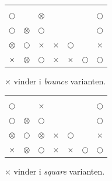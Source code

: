 \begin{minipage}{0.45\textwidth}
\centering
\begin{tabular}{|c|c|c|c|c|c|c|}
    \hline
    & & & & & & \\ 
    \hline
    & & & & & & \\
    \hline
    {\scriptsize$\bigcirc$} & & $\otimes$ & & & & {\scriptsize$\bigcirc$} \\
    \hline
    {\scriptsize$\bigcirc$} & $\otimes$ & {\scriptsize$\bigcirc$} & & & & {\scriptsize$\bigcirc$} \\
    \hline
    $\otimes$ & {\scriptsize$\bigcirc$} & $\times$ & $\times$ & {\scriptsize$\bigcirc$} & & $\times$ \\
    \hline
    $\times$ & $\otimes$ & {\scriptsize$\bigcirc$} & $\times$ & $\times $& {\scriptsize$\bigcirc$} & {\scriptsize$\bigcirc$} \\
    \hline
\end{tabular}

$\times$ vinder i \textit{bounce} varianten.
\end{minipage}
\begin{minipage}{0.45\textwidth}
\centering
\begin{tabular}{|c|c|c|c|c|c|c|}
    \hline
    & & & & & & \\ 
    \hline
    & & & & & & \\
    \hline
    {\scriptsize$\bigcirc$} & & $\times$ & & & & {\scriptsize$\bigcirc$} \\
    \hline
    {\scriptsize$\bigcirc$} & $\otimes$ & {\scriptsize$\bigcirc$} & & & & {\scriptsize$\bigcirc$} \\
    \hline
    $\otimes$ & {\scriptsize$\bigcirc$} & $\otimes$ & $\times$ & {\scriptsize$\bigcirc$} & & $\times$ \\
    \hline
    $\times$ & $\otimes$ & {\scriptsize$\bigcirc$} & $\times$ & $\times $& {\scriptsize$\bigcirc$} & {\scriptsize$\bigcirc$} \\
    \hline
\end{tabular}

$\times$ vinder i \textit{square} varianten.
\end{minipage}

\vfill
{}
\vfill\mbox{}

\newpage